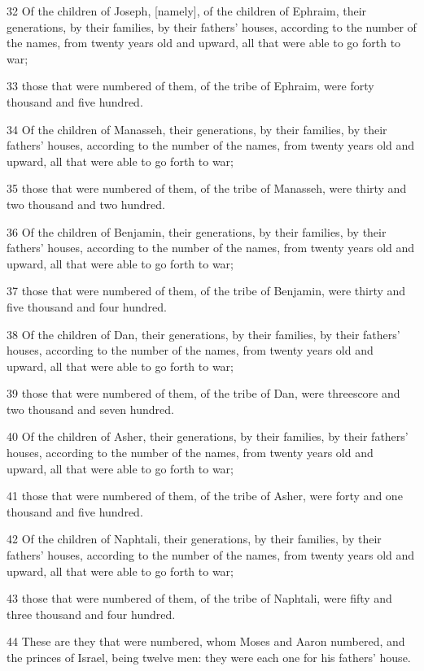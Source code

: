 \par 32 Of the children of Joseph, [namely], of the children of Ephraim, their generations, by their families, by their fathers' houses, according to the number of the names, from twenty years old and upward, all that were able to go forth to war;
\par 33 those that were numbered of them, of the tribe of Ephraim, were forty thousand and five hundred.
\par 34 Of the children of Manasseh, their generations, by their families, by their fathers' houses, according to the number of the names, from twenty years old and upward, all that were able to go forth to war;
\par 35 those that were numbered of them, of the tribe of Manasseh, were thirty and two thousand and two hundred.
\par 36 Of the children of Benjamin, their generations, by their families, by their fathers' houses, according to the number of the names, from twenty years old and upward, all that were able to go forth to war;
\par 37 those that were numbered of them, of the tribe of Benjamin, were thirty and five thousand and four hundred.
\par 38 Of the children of Dan, their generations, by their families, by their fathers' houses, according to the number of the names, from twenty years old and upward, all that were able to go forth to war;
\par 39 those that were numbered of them, of the tribe of Dan, were threescore and two thousand and seven hundred.
\par 40 Of the children of Asher, their generations, by their families, by their fathers' houses, according to the number of the names, from twenty years old and upward, all that were able to go forth to war;
\par 41 those that were numbered of them, of the tribe of Asher, were forty and one thousand and five hundred.
\par 42 Of the children of Naphtali, their generations, by their families, by their fathers' houses, according to the number of the names, from twenty years old and upward, all that were able to go forth to war;
\par 43 those that were numbered of them, of the tribe of Naphtali, were fifty and three thousand and four hundred.
\par 44 These are they that were numbered, whom Moses and Aaron numbered, and the princes of Israel, being twelve men: they were each one for his fathers' house.
